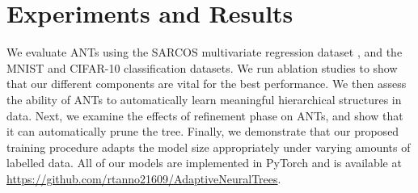 \section{Experiments and Results} \label{sec:experiments}
We evaluate ANTs using the SARCOS multivariate regression dataset \cite{vijayakumar2000locally}, and the MNIST \cite{lecun1998gradient} and CIFAR-10 \cite{krizhevsky2009learning} classification datasets. We run ablation studies to show that our different components are vital for the best performance. We then assess the ability of ANTs to automatically learn meaningful hierarchical structures in data. Next, we examine the effects of refinement phase on ANTs, and show that it can automatically prune the tree. Finally, we demonstrate that our proposed training procedure adapts the model size appropriately under varying amounts of labelled data. All of our models are implemented in PyTorch \cite{paszke2017automatic} and is available at  \url{https://github.com/rtanno21609/AdaptiveNeuralTrees}. 


